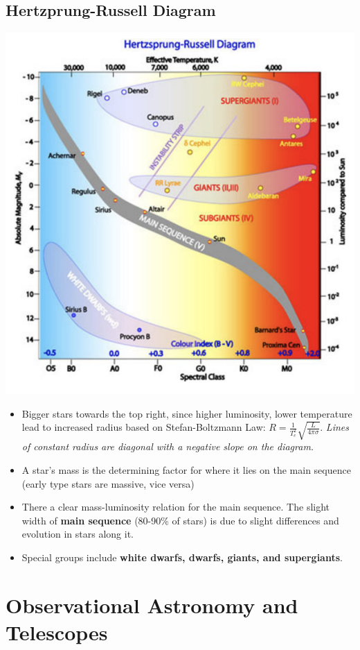 \documentclass[12pt]{article}
\begin{document}
\subsection{Hertzprung-Russell Diagram}
\includegraphics[scale=0.5]{Figures/HRDiagram.png}

\begin{itemize}
\item Bigger stars towards the top right, since higher luminosity, lower temperature lead to increased radius based on Stefan-Boltzmann Law: $R = \frac{1}{T_e^2}\sqrt{\frac{L}{4\pi\sigma}}$. \textit{Lines of constant radius are diagonal with a negative slope on the diagram.}
\item A star's mass is the determining factor for where it lies on the main sequence (early type stars are massive, vice versa) 
\item There a clear mass-luminosity relation for the main sequence. The slight width of \textbf{main sequence} (80-90\% of stars) is due to slight differences and evolution in stars along it.
\item Special groups include \textbf{white dwarfs, dwarfs, giants, and supergiants}.
\end{itemize}

\section{Observational Astronomy and Telescopes}
\end{document}
